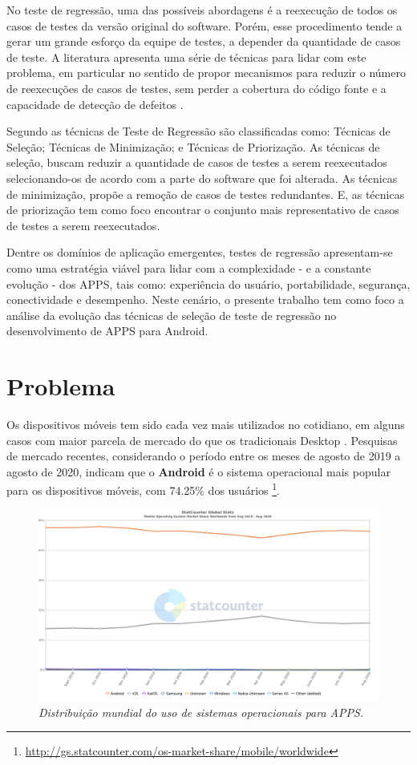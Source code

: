No teste de regressão, uma das possíveis abordagens é a reexecução de todos os casos de testes da versão original do software. Porém, esse procedimento tende a gerar um grande esforço da equipe de testes, a depender da quantidade de casos de teste. A literatura apresenta uma série de técnicas para lidar com este problema, em particular no sentido de propor mecanismos para reduzir o número de reexecuções de casos de testes, sem perder a cobertura do código fonte e a capacidade de detecção de defeitos  \cite{Graves:2001:ESR:367008.367020,ENGSTROM201014,KAZMI2017,ROMANO201862}.

Segundo  as técnicas de Teste de Regressão são classificadas como: Técnicas de Seleção; Técnicas de Minimização; e Técnicas de Priorização. As técnicas de seleção, buscam reduzir a quantidade de casos de testes a serem reexecutados selecionando-os de acordo com a parte do software que foi alterada. As técnicas de minimização, propõe a remoção de casos de testes redundantes. E, as técnicas de priorização tem como foco encontrar o conjunto mais representativo de casos de testes a serem reexecutados.

Dentre os domínios de aplicação emergentes, testes de regressão apresentam-se como uma estratégia viável para lidar com a complexidade - e a constante evolução - dos \ac{APPS}, tais como: experiência do usuário, portabilidade, segurança, conectividade e desempenho. Neste cenário, o presente trabalho tem como foco a análise da evolução das técnicas de seleção de teste de regressão no desenvolvimento de \ac{APPS} para Android.


\section{Problema}\label{sec:problema}

Os dispositivos móveis tem sido cada vez mais utilizados no cotidiano, em alguns casos com maior parcela de mercado do que os tradicionais Desktop \cite{Do2016RedroidAR}. Pesquisas de mercado recentes, considerando o período entre os meses de agosto de 2019 a agosto de 2020, indicam que o \textbf{Android} é o sistema operacional mais popular para os dispositivos móveis, com 74.25\% dos usuários \footnote{\url{http://gs.statcounter.com/os-market-share/mobile/worldwide}}.

\begin{figure}[!htb]
\centering
\includegraphics[width=.5\textwidth]{images/usuariosAndroid.png}
\caption{\textit{Distribuição mundial do uso de sistemas operacionais para \ac{APPS}.}}
\label{figure:usuariosAndroid}
\end{figure}


